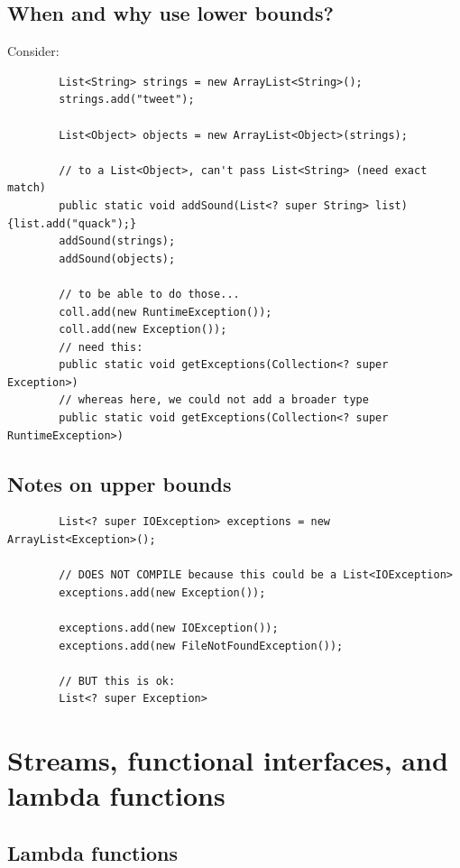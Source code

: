 \documentclass{scrartcl}
\begin{document}
\subsection{When and why use lower bounds?}

    Consider:

    \begin{lstlisting}
        List<String> strings = new ArrayList<String>();
        strings.add("tweet");

        List<Object> objects = new ArrayList<Object>(strings);

        // to a List<Object>, can't pass List<String> (need exact match)
        public static void addSound(List<? super String> list) {list.add("quack");}
        addSound(strings);
        addSound(objects);

        // to be able to do those...
        coll.add(new RuntimeException());
        coll.add(new Exception());
        // need this:
        public static void getExceptions(Collection<? super Exception>)
        // whereas here, we could not add a broader type
        public static void getExceptions(Collection<? super RuntimeException>)

    \end{lstlisting}

\subsection{Notes on upper bounds}

    \begin{lstlisting}
        List<? super IOException> exceptions = new ArrayList<Exception>();

        // DOES NOT COMPILE because this could be a List<IOException>
        exceptions.add(new Exception());

        exceptions.add(new IOException());
        exceptions.add(new FileNotFoundException());

        // BUT this is ok:
        List<? super Exception>
    \end{lstlisting}

\section{Streams, functional interfaces, and lambda functions}
\subsection{Lambda functions}
\end{document}
